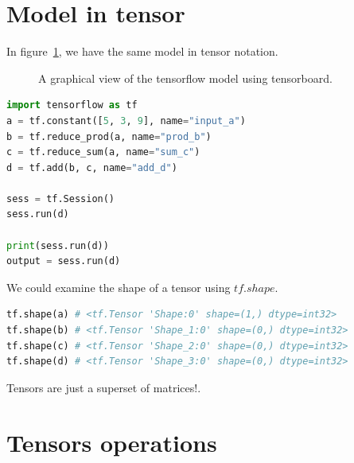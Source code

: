 \documentclass[vecarrow]{svproc}
\begin{document}
\section{Model in tensor}

In figure~\ref{fig:5}, we have the same model in tensor notation.

\begin{figure} 
\caption{A graphical view of the tensorflow model using tensorboard.}
\label{fig:5} 
\end{figure} 

\begin{lstlisting}[language=Python, 
caption={model in tensor},label={list2}]
import tensorflow as tf
a = tf.constant([5, 3, 9], name="input_a")
b = tf.reduce_prod(a, name="prod_b")
c = tf.reduce_sum(a, name="sum_c")
d = tf.add(b, c, name="add_d")

sess = tf.Session()
sess.run(d)

print(sess.run(d))
output = sess.run(d)
\end{lstlisting}

We could examine the shape of a tensor using $tf.shape$.
\begin{lstlisting}[language=Python, 
caption={shape of tensor},label={list3}]
tf.shape(a) # <tf.Tensor 'Shape:0' shape=(1,) dtype=int32>
tf.shape(b) # <tf.Tensor 'Shape_1:0' shape=(0,) dtype=int32>
tf.shape(c) # <tf.Tensor 'Shape_2:0' shape=(0,) dtype=int32>
tf.shape(d) # <tf.Tensor 'Shape_3:0' shape=(0,) dtype=int32>
\end{lstlisting}

Tensors	are	just	a	superset	of	matrices!.

\section{Tensors operations}
\end{document}
